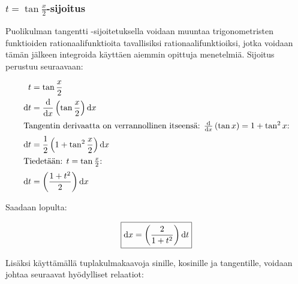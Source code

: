 \documentclass[../integrointiopas.tex]{subfiles}
\begin{document}
	\subsubsection{$t = \tan\frac{x}{2}$-sijoitus}
	
	Puolikulman tangentti -sijoitetuksella voidaan muuntaa trigonometristen funktioiden rationaalifunktioita tavallisiksi rationaalifunktioiksi, jotka voidaan tämän jälkeen integroida käyttäen aiemmin opittuja menetelmiä. Sijoitus perustuu seuraavaan:
		
	\begin{align}
		t &= \tan\frac{x}{2} \\
		\odif{t} &= \odv{}{x}\left(\tan\frac{x}{2}\right)\odif{x} \\
		\intertext{Tangentin derivaatta on verrannollinen itseensä: $\odv{}{x}\left(\tan x\right) = 1 + \tan^2x$:}
		\odif{t} &= \frac{1}{2}\left(1 + \tan^2\frac{x}{2}\right)\odif{x} \\
		\intertext{Tiedetään: $t = \tan\frac{x}{2}$:}
		\odif{t} &= \left(\frac{1 + t^2}{2}\right)\odif{x}
	\end{align}

	\noindent Saadaan lopulta:
	
	\begin{equation}
		\label{tant2dx}
		\boxed{\odif{x} = \left(\frac{2}{1 + t^2}\right)\odif{t}}
	\end{equation}

	Lisäksi käyttämällä tuplakulmakaavoja sinille, kosinille ja tangentille, voidaan johtaa seuraavat hyödylliset relaatiot:
	
\end{document}
